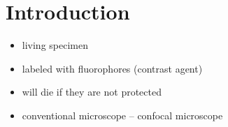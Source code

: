 \chapter{Introduction}
\begin{itemize}
\item living specimen
\item labeled with fluorophores (contrast agent)
\item will die if they are not protected
\item conventional microscope -- confocal microscope
\end{itemize}
